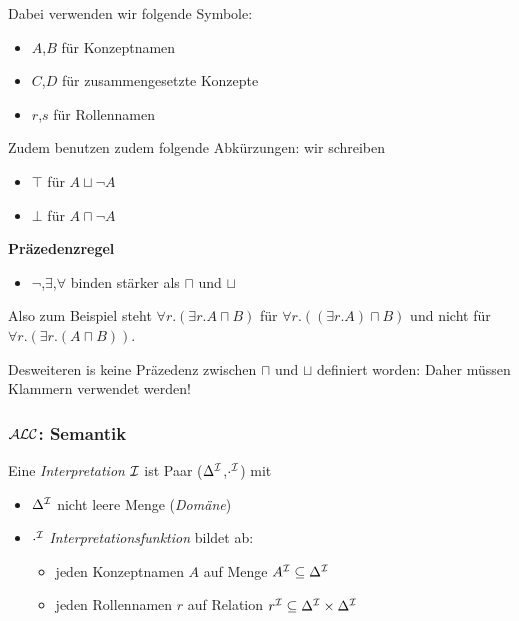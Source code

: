 Dabei verwenden wir folgende Symbole:

\begin{itemize}
  \item{$A$,$B$ für Konzeptnamen}
  \item{$C$,$D$ für zusammengesetzte Konzepte}
  \item{$r$,$s$ für Rollennamen}
\end{itemize}

Zudem benutzen zudem folgende Abkürzungen: wir schreiben

\begin{itemize}
  \item{$\top$ für $A \sqcup \neg A$}
  \item{$\bot$ für $A \sqcap \neg A$}
\end{itemize}

\textbf{Präzedenzregel}

\begin{itemize}
  \item{$\neg$,$\exists$,$\forall$ binden stärker als $\sqcap$ und $\sqcup$}
\end{itemize}

Also zum Beispiel steht $\forall r.(\exists r.A \sqcap B)$ für $\forall r.((\exists r.A) \sqcap B)$ und nicht für $\forall r.(\exists r.(A \sqcap B))$.

Desweiteren is keine Präzedenz zwischen $\sqcap$ und $\sqcup$ definiert worden: Daher müssen Klammern verwendet werden!

\subsubsection{\texorpdfstring{$\mathcal{A}\mathcal{L}\mathcal{C}$}{ALC}: Semantik}

\begin{definition}
Eine \emph{Interpretation} $\mathcal{I}$ ist Paar ($\Delta^{\mathcal{I}}$,$\cdot^{\mathcal{I}}$) mit
  \begin{itemize}
    \item{$\Delta^{\mathcal{I}}$ nicht leere Menge (\emph{Domäne})}
    \item{$\cdot^{\mathcal{I}}$ \emph{Interpretationsfunktion} bildet ab:
     \begin{itemize}
       \item{jeden Konzeptnamen $A$ auf Menge $A^{\mathcal{I}} \subseteq \Delta^{\mathcal{I}}$}
       \item{jeden Rollennamen $r$ auf Relation $r^{\mathcal{I}} \subseteq \Delta^{\mathcal{I}} \times \Delta^{\mathcal{I}}$}
     \end{itemize}}
  \end{itemize}
\end{definition}

